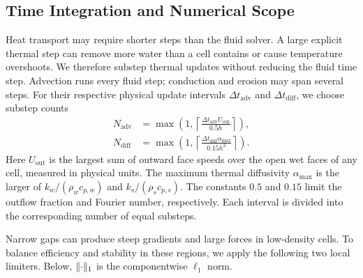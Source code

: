 \subsection{Time Integration and Numerical Scope}
\label{sec:scope}
Heat transport may require shorter steps than the fluid solver.
A large explicit thermal step can remove more water than a cell contains
or cause temperature overshoots. We therefore substep thermal updates
without reducing the fluid time step. Advection runs every fluid step;
conduction and erosion may span several steps. For their respective
physical update intervals $\Delta t_{\mathrm{adv}}$ and
$\Delta t_{\mathrm{diff}}$, we choose substep counts
\begin{equation}
      \begin{aligned}
            N_{\mathrm{adv}}  & =\max\!\left(1,
            \left\lceil\frac{\Delta t_{\mathrm{adv}}U_{\mathrm{out}}}{0.5h}\right\rceil\right), \\
            N_{\mathrm{diff}} & =\max\!\left(1,
            \left\lceil\frac{\Delta t_{\mathrm{diff}}\alpha_{\max}}{0.15h^2}\right\rceil\right).
      \end{aligned}
      \label{eq:thermal-bounds}
\end{equation}
Here $U_{\mathrm{out}}$ is the largest sum of outward face speeds over
the open wet faces of any cell, measured in physical units.
The maximum thermal diffusivity $\alpha_{\max}$ is the larger of
$k_w/(\rho_wc_{p,w})$ and $k_s/(\rho_sc_{p,s})$.
The constants $0.5$ and $0.15$ limit the outflow fraction and Fourier
number, respectively. Each interval is divided into the corresponding
number of equal substeps.

Narrow gaps can produce steep gradients and large forces in low-density
cells. To balance efficiency and stability in these regions, we apply
the following two local limiters.
Below, $\lVert\cdot\rVert_1$ is the componentwise $\ell_1$ norm.

